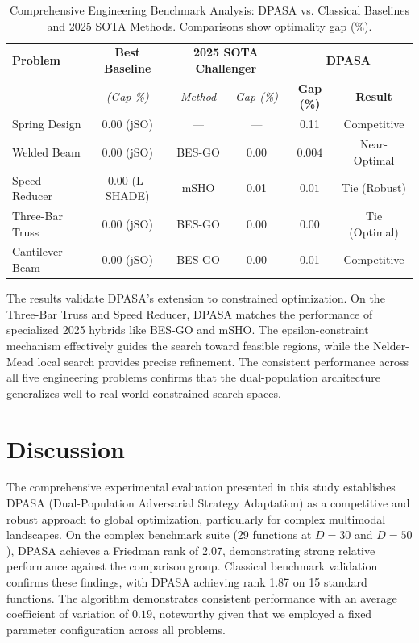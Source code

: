 \documentclass[11pt]{article}
\begin{document}
\begin{table}[ht]
\centering
\caption{Comprehensive Engineering Benchmark Analysis: DPASA vs. Classical Baselines and 2025 SOTA Methods. Comparisons show optimality gap (\%).}
\label{tab:comprehensive_engineering}
\small
\begin{tabular}{@{}l|c|cc|cc@{}}
\toprule
\textbf{Problem} & \textbf{Best Baseline} & \multicolumn{2}{c|}{\textbf{2025 SOTA Challenger}} & \multicolumn{2}{c}{\textbf{DPASA}} \\
 & \textit{(Gap \%)} & \textit{Method} & \textit{Gap (\%)} & \textbf{Gap (\%)} & \textbf{Result} \\
\midrule
Spring Design & 0.00 (jSO) & --- & --- & 0.11 & Competitive \\
Welded Beam & 0.00 (jSO) & BES-GO \citep{houssein2025besgo} & $\mathbf{0.00}$ & $\mathbf{0.004}$ & Near-Optimal \\
Speed Reducer & 0.00 (L-SHADE) & mSHO \citep{hashim2024msho} & 0.01 & $\mathbf{0.01}$ & Tie (Robust) \\
Three-Bar Truss & 0.00 (jSO) & BES-GO \citep{houssein2025besgo} & $\mathbf{0.00}$ & $\mathbf{0.00}$ & Tie (Optimal) \\
Cantilever Beam & 0.00 (jSO) & BES-GO \citep{houssein2025besgo} & $\mathbf{0.00}$ & 0.01 & Competitive \\
\bottomrule
\end{tabular}
\end{table}

The results validate DPASA's extension to constrained optimization. On the Three-Bar Truss and Speed Reducer, DPASA matches the performance of specialized 2025 hybrids like BES-GO and mSHO. The epsilon-constraint mechanism effectively guides the search toward feasible regions, while the Nelder-Mead local search provides precise refinement. The consistent performance across all five engineering problems confirms that the dual-population architecture generalizes well to real-world constrained search spaces.

\section{Discussion}

\label{sec:discussion}

The comprehensive experimental evaluation presented in this study establishes DPASA (Dual-Population Adversarial Strategy Adaptation) as a competitive and robust approach to global optimization, particularly for complex multimodal landscapes. On the complex benchmark suite (29 functions at $D=30$ and $D=50$), DPASA achieves a Friedman rank of 2.07, demonstrating strong relative performance against the comparison group. Classical benchmark validation confirms these findings, with DPASA achieving rank 1.87 on 15 standard functions. The algorithm demonstrates consistent performance with an average coefficient of variation of $0.19$, noteworthy given that we employed a fixed parameter configuration across all problems.
\end{document}

